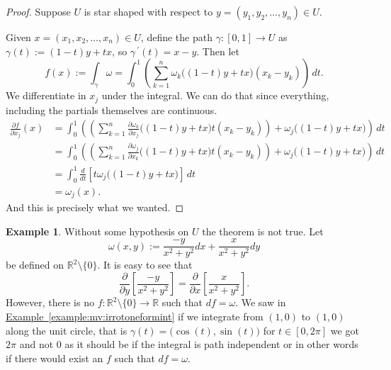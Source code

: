 \documentclass[12pt]{book}
\newcommand{\R}{{\mathbb{R}}}
\theoremstyle{plain}
\theoremstyle{remark}
\theoremstyle{definition}
\theoremstyle{exercise}
\theoremstyle{example}
\newtheorem{example}[thm]{Example}
\newcommand{\exampleref}[1]{\hyperref[#1]{Example~\ref*{#1}}}
\begin{document}
\begin{proof}
Suppose $U$ is star shaped with respect to $y=(y_1,y_2,\ldots,y_n) \in U$.

Given $x = (x_1,x_2,\ldots,x_n) \in U$, define the path $\gamma \colon [0,1] \to U$ as
$\gamma(t) := (1-t)y + tx$, so $\gamma^{\:\prime}(t) = x-y$.  Then let
\begin{equation*}
f(x) := \int_{\gamma} \omega
=
\int_0^1
\left(
\sum_{k=1}^n
\omega_k \bigl((1-t)y + tx \bigr) (x_k-y_k)
\right) \, dt .
\end{equation*}
We differentiate in $x_j$ under the integral.  We can do that since
everything, including the partials themselves are continuous.
\begin{equation*}
\begin{split}
\frac{\partial f}{\partial x_j}(x) & =
\int_0^1
\left(
\left(
\sum_{k=1}^n
\frac{\partial \omega_k}{\partial x_j} \bigl((1-t)y + tx \bigr) t
(x_k-y_k)
\right)
+
\omega_j \bigl((1-t)y + tx \bigr)
\right)
 \, dt
\\
& = 
\int_0^1
\left(
\left(
\sum_{k=1}^n
\frac{\partial \omega_j}{\partial x_k} \bigl((1-t)y + tx \bigr) t
(x_k-y_k)
\right)
+
\omega_j \bigl((1-t)y + tx \bigr)
\right) \, dt
\\
& = 
\int_0^1
\frac{d}{dt}
\left[
t \omega_j\bigl((1-t)y + tx \bigr)
\right]
\,
dt
\\
&= \omega_j(x) .
\end{split}
\end{equation*}
And this is precisely what we wanted.
\end{proof}

\begin{example}
Without some hypothesis on $U$ the theorem is not true.  Let
\begin{equation*}
\omega(x,y) := \frac{-y}{x^2+y^2} dx + \frac{x}{x^2+y^2} dy
\end{equation*}
be defined on $\R^2 \setminus \{ 0 \}$.  It is easy to see that
\begin{equation*}
\frac{\partial}{\partial y} \left[ 
\frac{-y}{x^2+y^2} \right] =
\frac{\partial}{\partial x} \left[ 
\frac{x}{x^2+y^2} \right] .
\end{equation*}
However, there is no $f \colon \R^2 \setminus \{ 0 \} \to \R$ such that 
$df = \omega$.  We saw in 
\exampleref{example:mv:irrotoneformint} if we integrate from $(1,0)$ to $(1,0)$
along the unit circle, that is $\gamma(t) = \bigl(\cos(t),\sin(t)\bigr)$
for $t \in [0,2\pi]$ we got $2\pi$ and not 0 as it should be if the integral
is path independent or in other words if there would exist an $f$ such that
$df = \omega$.
\end{example}
\end{document}

